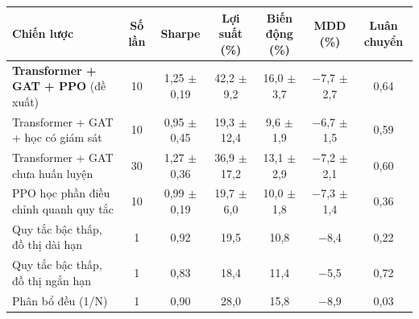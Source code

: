 \begin{tabular}{@{}lcccccc@{}}
\toprule
Chiến lược & Số lần & Sharpe & Lợi suất (\%) & Biến động (\%) & MDD (\%) & Luân chuyển \\
\midrule
\textbf{Transformer + GAT + PPO} (đề xuất) & 10 & 1{,}25 $\pm$ 0{,}19 & 42{,}2 $\pm$ 9{,}2 & 16{,}0 $\pm$ 3{,}7 & $-$7{,}7 $\pm$ 2{,}7 & 0{,}64 \\
Transformer + GAT + học có giám sát & 10 & 0{,}95 $\pm$ 0{,}45 & 19{,}3 $\pm$ 12{,}4 & 9{,}6 $\pm$ 1{,}9 & $-$6{,}7 $\pm$ 1{,}5 & 0{,}59 \\
Transformer + GAT chưa huấn luyện & 30 & 1{,}27 $\pm$ 0{,}36 & 36{,}9 $\pm$ 17{,}2 & 13{,}1 $\pm$ 2{,}9 & $-$7{,}2 $\pm$ 2{,}1 & 0{,}60 \\
PPO học phần điều chỉnh quanh quy tắc & 10 & 0{,}99 $\pm$ 0{,}19 & 19{,}7 $\pm$ 6{,}0 & 10{,}0 $\pm$ 1{,}8 & $-$7{,}3 $\pm$ 1{,}4 & 0{,}36 \\
Quy tắc bậc thấp, đồ thị dài hạn & 1 & 0{,}92 & 19{,}5 & 10{,}8 & $-$8{,}4 & 0{,}22 \\
Quy tắc bậc thấp, đồ thị ngắn hạn & 1 & 0{,}83 & 18{,}4 & 11{,}4 & $-$5{,}5 & 0{,}72 \\
Phân bổ đều (1/N) & 1 & 0{,}90 & 28{,}0 & 15{,}8 & $-$8{,}9 & 0{,}03 \\
\bottomrule
\end{tabular}

